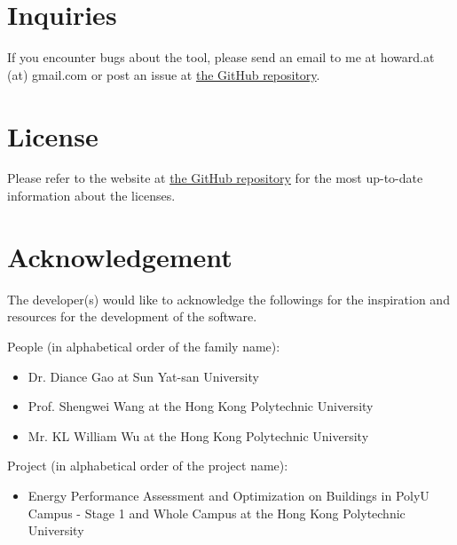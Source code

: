 \documentclass[12pt,a4paper]{article}
\begin{document}
\section{Inquiries}

If you encounter bugs about the tool, please send an email to me at howard.at (at) gmail.com or post an issue at \href{https://github.com/howardcheung/data-preprocessing-helper/}{the GitHub repository}.

\section{License}

Please refer to the website at \href{https://github.com/howardcheung/data-preprocessing-helper/}{the GitHub repository} for the most up-to-date information about the licenses.

\section{Acknowledgement}

The developer(s) would like to acknowledge the followings for the inspiration and resources for the development of the software.

People (in alphabetical order of the family name):
\begin{itemize}
\item Dr. Diance Gao at Sun Yat-san University
\item Prof. Shengwei Wang at the Hong Kong Polytechnic University
\item Mr. KL William Wu at the Hong Kong Polytechnic University
\end{itemize}

Project (in alphabetical order of the project name):
\begin{itemize}
\item Energy Performance Assessment and Optimization on Buildings in PolyU Campus - Stage 1 and Whole Campus at the Hong Kong Polytechnic University
\end{itemize}
\end{document}
